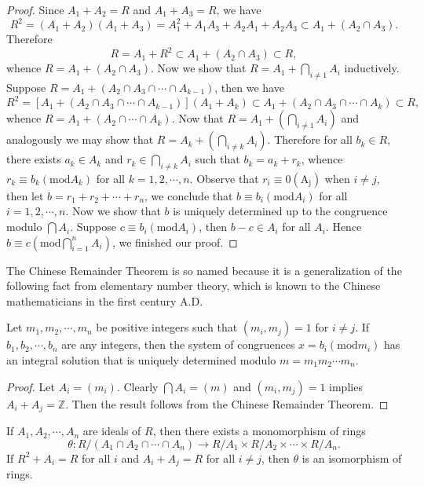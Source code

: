 \begin{proof}
Since $A_1+A_2=R$ and $A_1+A_3=R$, we have 
$$
R^2=\left( A_1+A_2 \right) \left( A_1+A_3 \right) =A_{1}^{2}+A_1A_3+A_2A_1+A_2A_3\subset A_1+\left( A_2\cap A_3 \right) .
$$
Therefore 
$$
R=A_1+R^2\subset A_1+\left( A_2\cap A_3 \right) \subset R,
$$
whence $R=A_1+(A_2\cap A_3)$. Now we show that $R=A_1+\bigcap_{i\ne 1}A_i$ inductively. Suppose $R=A_1+\left( A_2\cap A_3\cap \cdots \cap A_{k-1} \right) $, then we have 
$$
R^2=\left[ A_1+\left( A_2\cap A_3\cap \cdots \cap A_{k-1} \right) \right] \left( A_1+A_k \right) \subset A_1+\left( A_2\cap A_3\cap \cdots \cap A_k \right) \subset R,
$$
whence $R=A_1+(A_2\cap\cdots\cap A_k)$. Now that $R=A_1+\left( \bigcap_{i\ne 1}{A_i} \right) $ and analogously we may show that $R=A_k+\left( \bigcap_{i\ne k}{A_i} \right) $. Therefore for all $b_k\in R$, there exists $a_k\in A_k$ and $r_k\in\bigcap_{i\ne k}A_i$ such that $b_k=a_k+r_k$, whence $r_k\equiv b_k(\mathrm{mod}A_k)$ for all $k=1,2,\cdots,n$. Observe that $r_i\equiv0(\mathrm{A_j})$ when $i\ne j$, then let $b=r_1+r_2+\cdots+r_n$, we conclude that $b\equiv b_i(\mathrm{mod}A_i)$ for all $i=1,2,\cdots,n$. Now we show that $b$ is uniquely determined up to the congruence modulo $\bigcap A_i$. Suppose $c\equiv b_i(\mathrm{mod}A_i)$, then $b-c\in A_i$ for all $A_i$. Hence $b\equiv c\left( \mathrm{mod}\bigcap_{i=1}^n{A_i} \right) $, we finished our proof.
\end{proof}
The Chinese Remainder Theorem is so named because it is a generalization of the following fact from elementary number theory, which is known to the Chinese mathematicians in the first century A.D.
\begin{corollary}
Let $m_1,m_2,\cdots,m_n$ be positive integers such that $(m_i,m_j)=1$ for $i\ne j$. If $b_1,b_2,\cdots,b_n$ are any integers, then the system of congruences $x=b_i(\mathrm{mod}m_i)$ has an integral solution that is uniquely determined modulo $m=m_1m_2\cdots m_n$.
\end{corollary}
\begin{proof}
Let $A_i=(m_i)$. Clearly $\bigcap A_i=(m)$ and $(m_i,m_j)=1$ implies $A_i+A_j=\mathbb{Z}$. Then the result follows from the Chinese Remainder Theorem.
\end{proof}
\begin{corollary}
If $A_1,A_2,\cdots,A_n$ are ideals of $R$, then there exists a monomorphism of rings 
$$
\theta :R/\left( A_1\cap A_2\cap \cdots \cap A_n \right) \rightarrow R/A_1\times R/A_2\times \cdots \times R/A_n.
$$
If $R^2+A_i=R$ for all $i$ and $A_i+A_j=R$ for all $i\ne j$, then $\theta$ is an isomorphism of rings.
\end{corollary}
